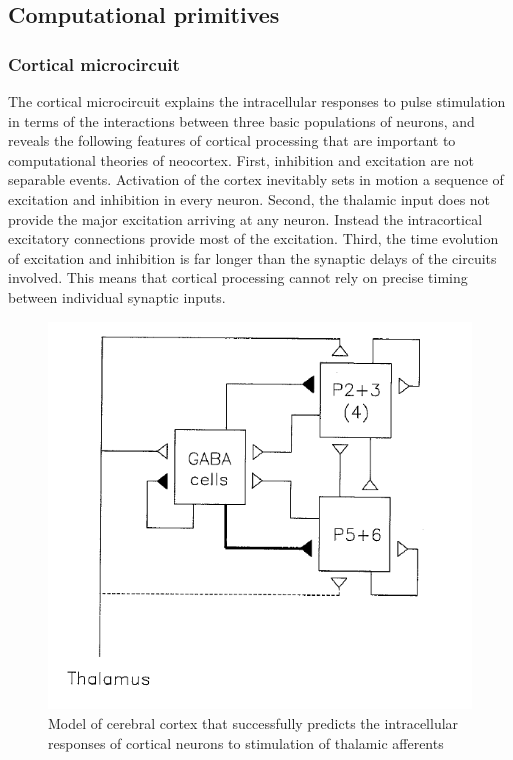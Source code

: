 \documentclass[main]{subfiles}
\begin{document}
\subsection{Computational primitives}
\subsubsection{Cortical microcircuit}

The cortical microcircuit explains the intracellular responses to pulse stimulation in terms of the interactions between three basic populations of neurons, and reveals the following features of cortical processing that are important to computational theories of neocortex. First, inhibition and excitation are not separable events. Activation of the cortex inevitably sets in motion a sequence of excitation and inhibition in every neuron. Second, the thalamic input does not provide the major excitation arriving at any neuron. Instead the intracortical excitatory connections provide most of the excitation. Third, the time evolution of excitation and inhibition is far longer than the synaptic delays of the circuits involved. This means that cortical processing cannot rely on precise timing between individual synaptic inputs.

%
\begin{figure}[h]
    \centering
    \includegraphics[width=0.8\linewidth]{12_NeuromorphicSystems2/figures/micro.PNG}
    \caption{Model of cerebral cortex that successfully predicts the intracellular
responses of cortical neurons to stimulation of thalamic afferents}
    \label{fig:micro}
\end{figure}
%
\end{document}
